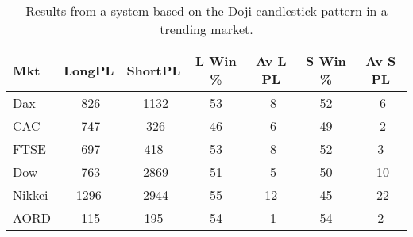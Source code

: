 \begin{table}[ht]
\centering
\caption[Results from a system based on the Doji candlestick pattern in a trending market]{Results from a system based on the Doji candlestick pattern in a trending market.} 
\label{tab:doji_aroon_results}
\begin{tabular}{lcccccc}
  \toprule Mkt & LongPL & ShortPL & L Win \% & Av L PL & S Win \% & Av S PL \\ 
  \midrule Dax & -826 & -1132 & 53 & -8 & 52 & -6 \\ 
  CAC & -747 & -326 & 46 & -6 & 49 & -2 \\ 
  FTSE & -697 & 418 & 53 & -8 & 52 & 3 \\ 
  Dow & -763 & -2869 & 51 & -5 & 50 & -10 \\ 
  Nikkei & 1296 & -2944 & 55 & 12 & 45 & -22 \\ 
  AORD & -115 & 195 & 54 & -1 & 54 & 2 \\ 
   \bottomrule \end{tabular}
\end{table}
